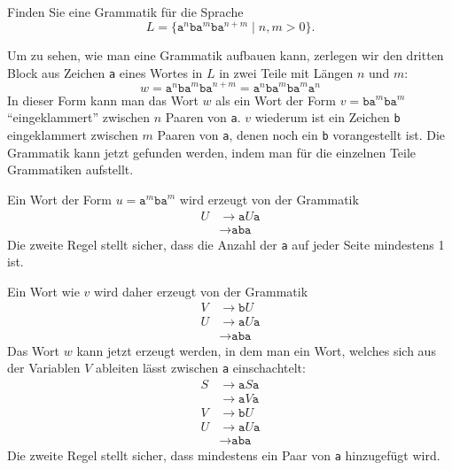 Finden Sie eine Grammatik für die Sprache
\[
L=\{
\texttt{a}^n\texttt{ba}^m\texttt{ba}^{n+m}
\;|\; n,m>0
\}.
\]


\begin{loesung}
Um zu sehen, wie man eine Grammatik aufbauen kann, zerlegen wir den
dritten Block aus Zeichen \texttt{a} eines Wortes in $L$ in zwei
Teile mit Längen $n$ und $m$:
\[
w
=
\texttt{a}^n\texttt{ba}^m\texttt{ba}^{n+m}
=
\texttt{a}^n\texttt{ba}^m\texttt{ba}^m \texttt{a}^n
\]
In dieser Form kann man das Wort $w$ als ein Wort der Form
$v=\texttt{ba}^m\texttt{ba}^m$ ``eingeklammert'' zwischen $n$ Paaren von
\texttt{a}.
$v$ wiederum ist ein Zeichen \texttt{b} eingeklammert zwischen $m$ Paaren
von \texttt{a}, denen noch ein \texttt{b} vorangestellt ist.
Die Grammatik kann jetzt gefunden werden, indem man für die einzelnen
Teile Grammatiken aufstellt.

Ein Wort der Form $u=\texttt{a}^m\texttt{ba}^m$ wird erzeugt von der Grammatik
\begin{align*}
U&\to \texttt{a}U\texttt{a} \\
 &\to \texttt{aba}
\end{align*}
Die zweite Regel stellt sicher, dass die Anzahl der \texttt{a} auf jeder
Seite mindestens 1 ist.

Ein Wort wie $v$ wird daher erzeugt von der Grammatik
\begin{align*}
V&\to \texttt{b}U \\
U&\to \texttt{a}U\texttt{a} \\
 &\to \texttt{aba}
\end{align*}
Das Wort $w$ kann jetzt erzeugt werden, in dem man ein Wort, welches sich
aus der Variablen $V$ ableiten lässt zwischen \texttt{a} einschachtelt:
\begin{align*}
S&\to \texttt{a}S\texttt{a}\\
 &\to \texttt{a}V\texttt{a}\\
V&\to \texttt{b}U \\
U&\to \texttt{a}U\texttt{a} \\
 &\to \texttt{aba}
\end{align*}
Die zweite Regel stellt sicher, dass mindestens ein Paar von \texttt{a}
hinzugefügt wird.
\end{loesung}
